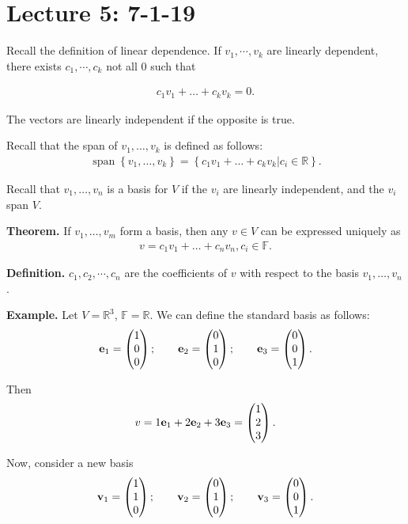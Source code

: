 \documentclass{article}
\newcommand{\mat}[1]{\begin{pmatrix}#1\end{pmatrix}}
\newcommand{\RR}{\mathbb{R}}
\DeclareMathOperator{\Span}{span}
\begin{document}
\section{Lecture 5: 7-1-19}

Recall the definition of linear dependence.  If $v_1, \cdots, v_k$ are linearly dependent, there exists $c_1, \cdots, c_k$ not all 0 such that

\begin{align*}
  c_1 v_1 + \dots + c_k v_k = 0.
\end{align*}

The vectors are linearly independent if the opposite is true.

Recall that the span of $v_1, \dots, v_k$ is defined as follows:
\begin{align*}
  \Span \left\{ v_1, \dots, v_k \right\} = \left\{ c_1 v_1 + \dots + c_k v_k | c_i \in \RR \right\}.
\end{align*}

Recall that $v_1, \dots, v_n$ is a basis for $V$ if the $v_i$ are linearly independent, and the $v_i$ span $V$.

{\bf Theorem.} If $v_1, \dots, v_m$ form a basis, then any $v \in V$ can be expressed uniquely as
\begin{align*}
  v = c_1 v_1 + \dots + c_n v_n, c_i \in \mathbb{F}.
\end{align*}

{\bf Definition.} $c_1, c_2, \cdots, c_n$ are the coefficients of $v$ with respect to the basis $v_1, \dots, v_n$.

{\bf Example.} Let $V = \mathbb{R}^3$, $\mathbb{F} = \mathbb{R}$.  We can define the standard basis as follows:
\begin{align*}
  \mbf{e}_1 = \mat{1 \\ 0 \\ 0}; \qquad \mbf{e}_2 = \mat{0 \\ 1 \\ 0}; \qquad \mbf{e}_3 = \mat{0 \\ 0 \\ 1}.
\end{align*}

Then
\begin{align*}
  v = 1 \mbf{e}_1 + 2 \mbf{e}_2 + 3\mbf{e}_3 = \mat{1 \\ 2 \\ 3}.
\end{align*}

Now, consider a new basis
\begin{align*}
  \mbf{v}_1 = \mat{1 \\ 1 \\ 0}; \qquad \mbf{v}_2 = \mat{0 \\ 1 \\ 0}; \qquad \mbf{v}_3 = \mat{0 \\ 0 \\ 1}.
\end{align*}
\end{document}
